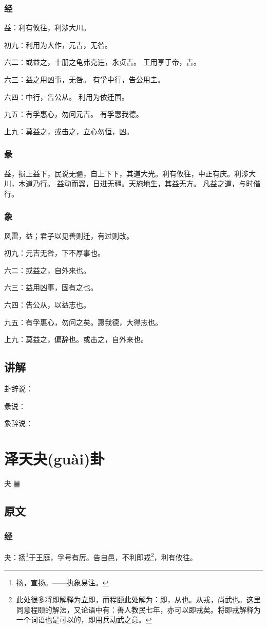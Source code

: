 \documentclass[12pt,oneside]{book}
\begin{document}
\subsection{经}
益：利有攸往，利涉大川。

初九：利用为大作，元吉，无咎。

六二：或益之，十朋之龟弗克违，永贞吉。 王用享于帝，吉。

六三：益之用凶事，无咎。 有孚中行，告公用圭。

六四：中行，告公从。 利用为依迁国。

九五：有孚惠心，勿问元吉。 有孚惠我德。

上九：莫益之，或击之，立心勿恒，凶。

\subsection{彖}
益，损上益下，民说无疆，自上下下，其道大光。利有攸往，中正有庆。利涉大川，木道乃行。 益动而巽，日进无疆。天施地生，其益无方。 凡益之道，与时偕行。

\subsection{象}
风雷，益；君子以见善则迁，有过则改。

初九：元吉无咎，下不厚事也。

六二：或益之，自外来也。

六三：益用凶事，固有之也。

六四：告公从，以益志也。

九五：有孚惠心，勿问之矣。惠我德，大得志也。

上九：莫益之，偏辞也。或击之，自外来也。

\section{讲解}
卦辞说：

彖说：

象辞说：

\chapter{泽天夬(guài)卦}
夬 {\Large ䷪}
\section{原文}

\subsection{经}
夬：扬\footnote{扬，宣扬。——执象易注。}于王庭，孚号有厉。告自邑，不利即戎\footnote{此处很多将即解释为立即，而程颐此处解为：即，从也。从戎，尚武也。这里同意程颐的解法，又论语中有：善人教民七年，亦可以即戎矣。将即戎解释为一个词语也是可以的，即用兵动武之意。}，利有攸往。
\end{document}

